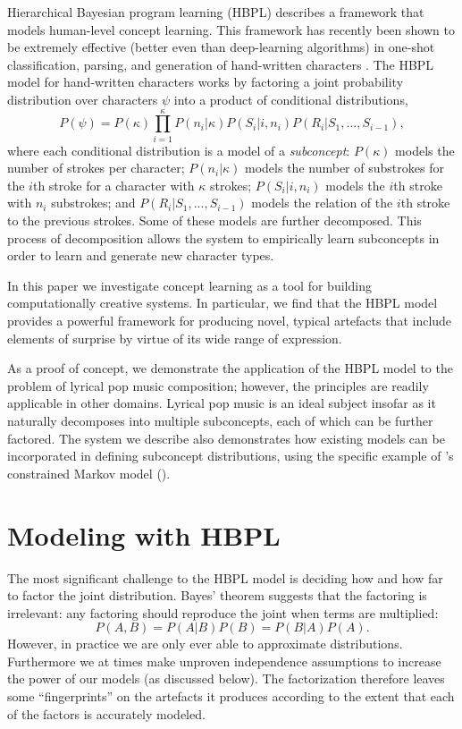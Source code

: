 \documentclass[letterpaper]{article}
\begin{document}
Hierarchical Bayesian program learning (HBPL) describes a framework that models human-level concept learning. This framework has recently been shown to be extremely effective (better even than deep-learning algorithms) in one-shot classification, parsing, and generation of hand-written characters \cite{lake2015human}. The HBPL model for hand-written characters works by factoring a joint probability distribution over characters $\psi$ into a product of conditional distributions,
\small
\begin{equation} \label{eq:1}
P(\psi) = P(\kappa) \prod_{i=1}^{\kappa} P(n_i|\kappa)P(S_i|i,n_i)P(R_i|S_1, ..., S_{i-1}),
\end{equation}
\normalsize
\noindent where each conditional distribution is a model of a \textit{subconcept}: \( P(\kappa) \) models the number of strokes per character; \( P(n_i|\kappa) \) models the number of substrokes for the $i$th stroke for a character with $\kappa$ strokes; \( P(S_i|i,n_i) \) models the $i$th stroke with $n_i$ substrokes; and \( P(R_i|S_1, ..., S_{i-1}) \) models the relation of the $i$th stroke to the previous strokes. Some of these models are further decomposed. This process of decomposition allows the system to empirically learn subconcepts in order to learn and generate new character types.

In this paper we investigate concept learning as a tool for building computationally creative systems. In particular, we find that the HBPL model provides a powerful framework for producing novel, typical artefacts that include elements of surprise by virtue of its wide range of expression.

As a proof of concept, we demonstrate the application of the HBPL model to the problem of lyrical pop music composition; however, the principles are readily applicable in other domains. Lyrical pop music is an ideal subject insofar as it naturally decomposes into multiple subconcepts, each of which can be further factored. The system we describe also demonstrates how existing models can be incorporated in defining subconcept distributions, using the specific example of \citeauthor{pachet2001finite}'s constrained Markov model (\citeyear{pachet2001finite}).

\section{Modeling with HBPL}

The most significant challenge to the HBPL model is deciding how and how far to factor the joint distribution. Bayes' theorem suggests that the factoring is irrelevant: any factoring should reproduce the joint when terms are multiplied:
\[ P(A,B) = P(A|B)P(B) = P(B|A)P(A). \]
However, in practice we are only ever able to approximate distributions. Furthermore we at times make unproven independence assumptions to increase the power of our models (as discussed below). The factorization therefore leaves some ``fingerprints'' on the artefacts it produces according to the extent that each of the factors is accurately modeled.
\end{document}

